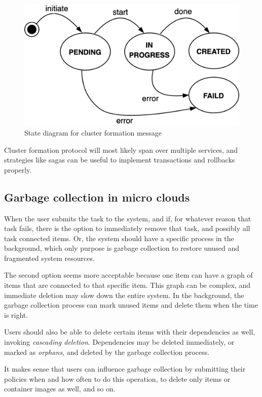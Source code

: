 \begin{figure}[H]
	\begin{center}
		\includegraphics[scale=1]{images/Figure19}
	\end{center}
	\vspace{-0.6cm}
	\caption{State diagram for cluster formation message}
	\label{fig:fig19}
\end{figure}

Cluster formation protocol will most likely span over multiple services, and strategies like sagas can be useful to implement transactions and rollbacks properly.
%
%
\subsection{Garbage collection in micro clouds}\label{sec:garbage}
%
When the user submits the task to the system, and if, for whatever reason that task fails, there is the option to immediately remove that task, and possibly all task connected items. Or, the system should have a specific process in the background, which only purpose is garbage collection to restore unused and fragmented system resources.

The second option seems more acceptable because one item can have a graph of items that are connected to that specific item. This graph can be complex, and immediate deletion may slow down the entire system. In the background, the garbage collection process can mark unused items and delete them when the time is right.

Users should also be able to delete certain items with their dependencies as well, invoking \emph{cascading deletion}. Dependencies may be deleted immediately, or marked as \emph{orphans}, and deleted by the garbage collection process.

It makes sense that users can influence garbage collection by submitting their policies when and how often to do this operation, to delete only items or container images as well, and so on.
%
%
